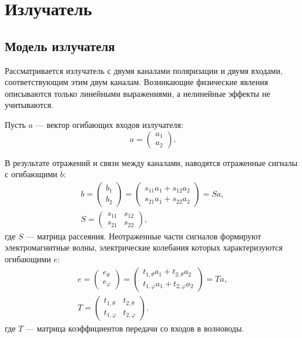 \chapter{Излучатель}


\section{Модель излучателя}

Рассматривается излучатель с двумя каналами поляризации и двумя входами, соответствующим этим двум каналам. Возникающие физические явления описываются только
линейными выражениями, а нелинейные эффекты не учитываются.

Пусть $a$ --- вектор огибающих входов излучателя:
\[
    a
    = \begin{pmatrix}
          a_1 \\
          a_2
    \end{pmatrix} .
\]

В результате отражений и связи между каналами, наводятся отраженные сигналы с огибающими $b$:
\begin{gather*}
    b
    = \begin{pmatrix}
          b_1 \\
          b_2
    \end{pmatrix}
    = \begin{pmatrix}
          s_{11} a_1 + s_{12} a_2 \\
          s_{21} a_1 + s_{22} a_2
    \end{pmatrix}
    = S a, \\
    S
    = \begin{pmatrix}
          s_{11} & s_{12} \\
          s_{21} & s_{22}
    \end{pmatrix},
\end{gather*}
где $S$ --- матрица рассеяния. Неотраженные части сигналов формируют электромагнитные волны, электрические колебания которых характеризуются огибающими $e$:
\begin{gather*}
    e
    = \begin{pmatrix}
          e_\theta \\
          e_\varphi
    \end{pmatrix}
    = \begin{pmatrix}
          t_{1, \theta} a_1 + t_{2, \theta} a_2 \\
          t_{1, \varphi} a_1 + t_{2, \varphi} a_2
    \end{pmatrix}
    = T a, \\
    T
    = \begin{pmatrix}
          t_{1, \theta}  & t_{2, \theta}  \\
          t_{1, \varphi} & t_{2, \varphi}
    \end{pmatrix} .
\end{gather*}
где $T$ --- матрица коэффициентов передачи со входов в волноводы.


